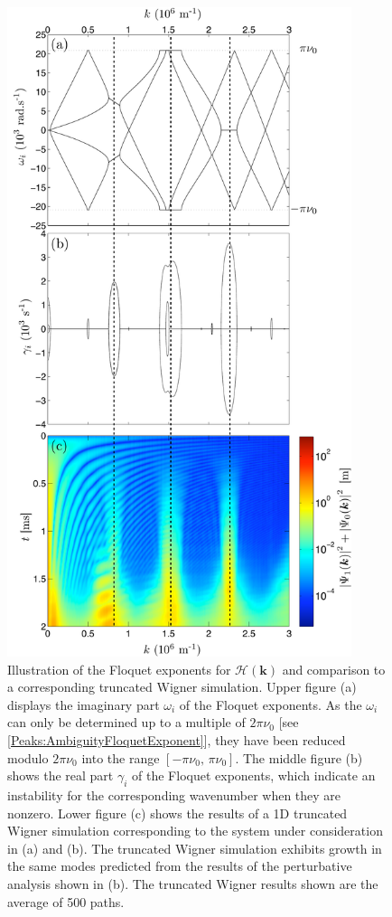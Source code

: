 \begin{figure}
    \centering
    \includegraphics[height=19cm]{CondensateEigenvalues}
    \caption{\label{Peaks:CondensateEigenvalues}
        Illustration of the Floquet exponents for $\mathcal{H}(\bm{k})$ and comparison to a corresponding truncated Wigner simulation.
        Upper figure (a) displays the imaginary part $\omega_i$ of the Floquet exponents. As the $\omega_i$ can only be determined up to a multiple of $2\pi\nu_0$ [see \eqref{Peaks:AmbiguityFloquetExponent}], they have been reduced modulo $2\pi\nu_0$ into the range $\left[-\pi\nu_0,\, \pi\nu_0\right]$.
        The middle figure (b) shows the real part $\gamma_i$ of the Floquet exponents, which indicate an instability for the corresponding wavenumber when they are nonzero.
        Lower figure (c) shows the results of a 1D truncated Wigner simulation corresponding to the system under consideration in (a) and (b). The truncated Wigner simulation exhibits growth in the same modes predicted from the results of the perturbative analysis shown in (b). The truncated Wigner results shown are the average of 500 paths.}
\end{figure}

